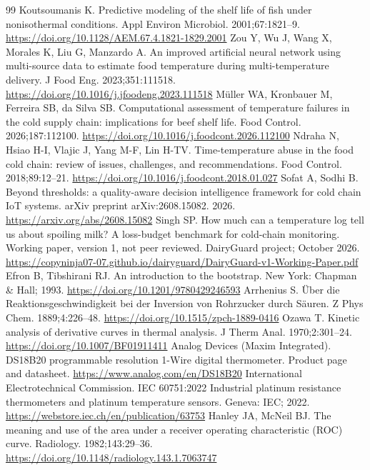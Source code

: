 {\begin{thebibliography}{99}
 Koutsoumanis K. Predictive modeling of the shelf life of fish under nonisothermal conditions. Appl Environ Microbiol. 2001;67:1821--9. \url{https://doi.org/10.1128/AEM.67.4.1821-1829.2001}
 Zou Y, Wu J, Wang X, Morales K, Liu G, Manzardo A. An improved artificial neural network using multi-source data to estimate food temperature during multi-temperature delivery. J Food Eng. 2023;351:111518. \url{https://doi.org/10.1016/j.jfoodeng.2023.111518}
 Müller WA, Kronbauer M, Ferreira SB, da Silva SB. Computational assessment of temperature failures in the cold supply chain: implications for beef shelf life. Food Control. 2026;187:112100. \url{https://doi.org/10.1016/j.foodcont.2026.112100}
 Ndraha N, Hsiao H-I, Vlajic J, Yang M-F, Lin H-TV. Time-temperature abuse in the food cold chain: review of issues, challenges, and recommendations. Food Control. 2018;89:12--21. \url{https://doi.org/10.1016/j.foodcont.2018.01.027}
 Sofat A, Sodhi B. Beyond thresholds: a quality-aware decision intelligence framework for cold chain IoT systems. arXiv preprint arXiv:2608.15082. 2026. \url{https://arxiv.org/abs/2608.15082}
 Singh SP. How much can a temperature log tell us about spoiling milk? A loss-budget benchmark for cold-chain monitoring. Working paper, version 1, not peer reviewed. DairyGuard project; October 2026. \url{https://copyninja07-07.github.io/dairyguard/DairyGuard-v1-Working-Paper.pdf}
 Efron B, Tibshirani RJ. An introduction to the bootstrap. New York: Chapman \& Hall; 1993. \url{https://doi.org/10.1201/9780429246593}
 Arrhenius S. Über die Reaktionsgeschwindigkeit bei der Inversion von Rohrzucker durch Säuren. Z Phys Chem. 1889;4:226--48. \url{https://doi.org/10.1515/zpch-1889-0416}
 Ozawa T. Kinetic analysis of derivative curves in thermal analysis. J Therm Anal. 1970;2:301--24. \url{https://doi.org/10.1007/BF01911411}
 Analog Devices (Maxim Integrated). DS18B20 programmable resolution 1-Wire digital thermometer. Product page and datasheet. \url{https://www.analog.com/en/DS18B20}
 International Electrotechnical Commission. IEC 60751:2022 Industrial platinum resistance thermometers and platinum temperature sensors. Geneva: IEC; 2022. \url{https://webstore.iec.ch/en/publication/63753}
 Hanley JA, McNeil BJ. The meaning and use of the area under a receiver operating characteristic (ROC) curve. Radiology. 1982;143:29--36. \url{https://doi.org/10.1148/radiology.143.1.7063747}

\end{thebibliography}}
